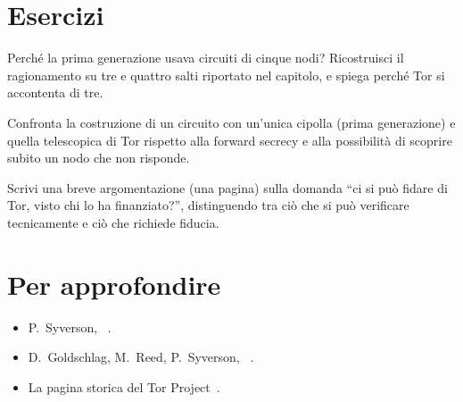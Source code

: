 \section*{Esercizi}

\begin{esercizio}[1]\label{es:03-cinque}
Perché la prima generazione usava circuiti di cinque nodi? Ricostruisci il ragionamento su tre e quattro salti riportato nel capitolo, e spiega perché Tor si accontenta di tre.
\end{esercizio}

\begin{esercizio}[2]\label{es:03-cipolla}
Confronta la costruzione di un circuito con un'unica cipolla (prima generazione) e quella telescopica di Tor rispetto alla forward secrecy e alla possibilità di scoprire subito un nodo che non risponde.
\end{esercizio}

\begin{esercizio}[2]\label{es:03-fiducia}
Scrivi una breve argomentazione (una pagina) sulla domanda \enquote{ci si può fidare di Tor, visto chi lo ha finanziato?}, distinguendo tra ciò che si può verificare tecnicamente e ciò che richiede fiducia.
\end{esercizio}

\section*{Per approfondire}
\begin{itemize}
  \item P.~Syverson, ~\cite{syverson2011peel}.
  \item D.~Goldschlag, M.~Reed, P.~Syverson, ~\cite{goldschlag1996hiding}.
  \item La pagina storica del Tor Project~\cite{torhistory}.
\end{itemize}
